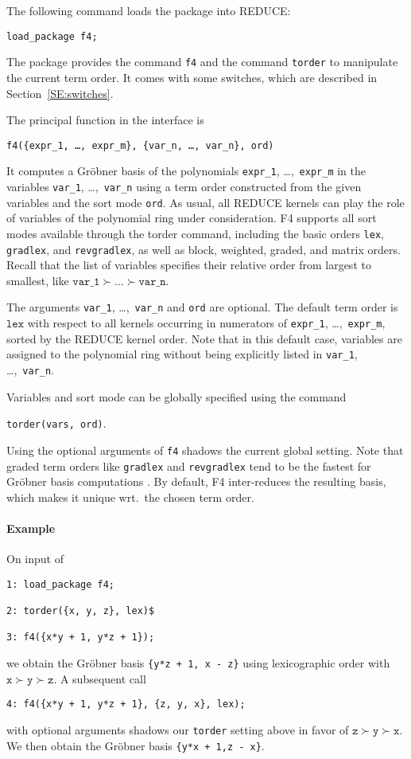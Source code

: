 \documentclass{article}
\newcommand{\grobner}{Gr\"obner}
\newcommand{\code}[1]{\texttt{#1}}
\begin{document}
The following command loads the package into REDUCE:
%
\begin{center}
    \code{load\_package f4;}
\end{center}

The package provides the command \code{f4} and the command \code{torder} to manipulate the current
term order. It comes with some switches, which are described in Section~\ref{SE:switches}.

The principal function in the interface is
%
\begin{center}
    \code{f4(\{expr\_1, \ldots, expr\_m\}, \{var\_n, \ldots, var\_n\}, ord)}
\end{center}
%
It computes a \grobner{} basis of the polynomials \code {expr\_1}, \dots,~\code{expr\_m} in the variables 
\code{var\_1}, \dots,~\code{var\_n} using a
term order constructed from the given variables and the sort mode \code{ord}. As usual, all REDUCE
kernels can play the role of variables of the polynomial ring under consideration. F4 supports all sort modes
available through the torder command, including the basic orders \code{lex}, 
\code{gradlex}, and \code{revgradlex}, as well as block, weighted, graded, and matrix orders. 
Recall that the list of variables
specifies their relative order from largest to smallest, like $\code{var\_1} \succ \dots \succ
\code{var\_n}$.

The arguments \code{var\_1}, \dots,~\code{var\_n} and \code{ord} are optional. The default term
order is $\code{lex}$ with respect to all kernels occurring in numerators of \code{expr\_1},
\dots,~\code{expr\_m}, sorted by the REDUCE kernel order. Note that in this default case, variables
are assigned to the polynomial ring without being explicitly listed in \code{var\_1},
\dots,~\code{var\_n}.

Variables and sort mode can be globally specified using the command
%
\begin{center}
    \code{torder(vars, ord)}.
\end{center}
%
Using the optional arguments of \code{f4} shadows the current global
setting. Note that graded term orders like
\code{gradlex} and \code{revgradlex} tend to be the fastest for \grobner{}
basis computations \cite[\S5]{tolstaya}. By default, F4 inter-reduces the resulting basis, 
which makes it unique wrt.~the chosen term order.
%
\paragraph{Example}
On input of
\begin{verbatim}
1: load_package f4;

2: torder({x, y, z}, lex)$

3: f4({x*y + 1, y*z + 1});
\end{verbatim}
we obtain the \grobner{} basis
\code{\{y*z + 1, x - z\}} using lexicographic order with $\code{x} \succ
\code{y} \succ \code{z}$. A subsequent call
\begin{verbatim}
4: f4({x*y + 1, y*z + 1}, {z, y, x}, lex);
\end{verbatim}
with optional arguments shadows our \code{torder} setting above in favor of $
\code{z}
\succ \code{y} \succ \code{x}$. We then obtain the \grobner{} basis
\code{\{y*x + 1,z - x\}}.
%
\end{document}
